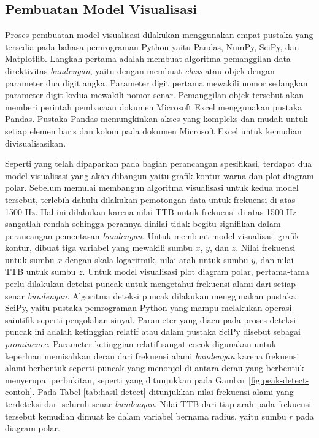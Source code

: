 \subsection{Pembuatan Model Visualisasi}
Proses pembuatan model visualisasi dilakukan menggunakan empat pustaka yang tersedia pada bahasa pemrograman Python yaitu Pandas, NumPy, SciPy, dan Matplotlib. Langkah pertama adalah membuat algoritma pemanggilan data direktivitas \emph{bundengan}, yaitu dengan membuat \emph{class} atau objek dengan parameter dua digit angka. Parameter digit pertama mewakili nomor \bundengan sedangkan parameter digit kedua mewakili nomor senar. Pemanggilan objek tersebut akan memberi perintah pembacaan dokumen Microsoft Excel menggunakan pustaka Pandas. Pustaka Pandas memungkinkan akses yang kompleks dan mudah untuk setiap elemen baris dan kolom pada dokumen Microsoft Excel untuk kemudian divisualisasikan. \par 

Seperti yang telah dipaparkan pada bagian perancangan spesifikasi, terdapat dua model visualisasi yang akan dibangun yaitu grafik kontur warna dan plot diagram polar. Sebelum memulai membangun algoritma visualisasi untuk kedua model tersebut, terlebih dahulu dilakukan pemotongan data untuk frekuensi di atas 1500 Hz. Hal ini dilakukan karena nilai TTB untuk frekuensi di atas 1500 Hz sangatlah rendah sehingga perannya dinilai tidak begitu signifikan dalam perancangan pementasan \emph{bundengan}. Untuk membuat model visualisasi grafik kontur, dibuat tiga variabel yang mewakili sumbu $x$, $y$, dan $z$. Nilai frekuensi untuk sumbu $x$ dengan skala logaritmik, nilai arah untuk sumbu $y$, dan nilai TTB untuk sumbu $z$. Untuk model visualisasi plot diagram polar, pertama-tama perlu dilakukan deteksi puncak untuk mengetahui frekuensi alami dari setiap senar \emph{bundengan}. Algoritma deteksi puncak dilakukan menggunakan pustaka SciPy, yaitu pustaka pemrograman Python yang mampu melakukan operasi saintifik seperti pengolahan sinyal. Parameter yang diacu pada proses deteksi puncak ini adalah ketinggian relatif atau dalam pustaka SciPy disebut sebagai \emph{prominence}. Parameter ketinggian relatif sangat cocok digunakan untuk keperluan memisahkan derau dari frekuensi alami \emph{bundengan} karena frekuensi alami berbentuk seperti puncak yang menonjol di antara derau yang berbentuk menyerupai perbukitan, seperti yang ditunjukkan pada Gambar \ref{fig:peak-detect-contoh}. Pada Tabel \ref{tab:hasil-detect} ditunjukkan nilai frekuensi alami yang terdeteksi dari seluruh senar \emph{bundengan}. Nilai TTB dari tiap arah pada frekuensi tersebut kemudian dimuat ke dalam variabel bernama radius, yaitu sumbu $r$ pada diagram polar. \par 

